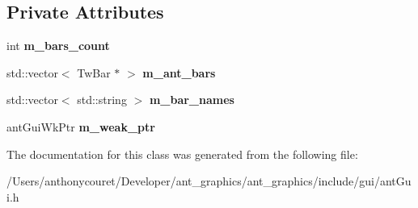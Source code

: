 \subsection*{Private Attributes}
\begin{DoxyCompactItemize}
\item 
\hypertarget{classant_gui_adf2f6e372b6dc46315d66531edf6179f}{int {\bfseries m\+\_\+bars\+\_\+count}}\label{classant_gui_adf2f6e372b6dc46315d66531edf6179f}

\item 
\hypertarget{classant_gui_a4f83fb0fdc6e4f2aa3a2112b3dc23444}{std\+::vector$<$ Tw\+Bar $\ast$ $>$ {\bfseries m\+\_\+ant\+\_\+bars}}\label{classant_gui_a4f83fb0fdc6e4f2aa3a2112b3dc23444}

\item 
\hypertarget{classant_gui_a33923e64b3106da222d90d70bc5b4eec}{std\+::vector$<$ std\+::string $>$ {\bfseries m\+\_\+bar\+\_\+names}}\label{classant_gui_a33923e64b3106da222d90d70bc5b4eec}

\item 
\hypertarget{classant_gui_a0725f279e92c15c3dbf01b222bba1907}{ant\+Gui\+Wk\+Ptr {\bfseries m\+\_\+weak\+\_\+ptr}}\label{classant_gui_a0725f279e92c15c3dbf01b222bba1907}

\end{DoxyCompactItemize}


The documentation for this class was generated from the following file\+:\begin{DoxyCompactItemize}
\item 
/\+Users/anthonycouret/\+Developer/ant\+\_\+graphics/ant\+\_\+graphics/include/gui/ant\+Gui.\+h\end{DoxyCompactItemize}
